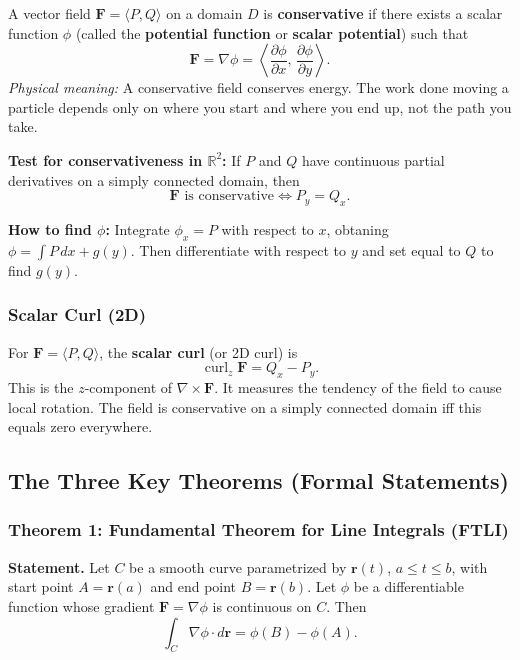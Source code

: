 \documentclass[11pt]{article}
\begin{document}
A vector field $\mathbf{F} = \langle P, Q \rangle$ on a domain $D$ is \textbf{conservative} if there exists a scalar function $\phi$ (called the \textbf{potential function} or \textbf{scalar potential}) such that
\[
  \mathbf{F} = \nabla\phi = \left\langle \frac{\partial\phi}{\partial x},\, \frac{\partial\phi}{\partial y} \right\rangle.
\]
\textit{Physical meaning:} A conservative field conserves energy. The work done moving a particle depends only on where you start and where you end up, not the path you take.

\textbf{Test for conservativeness in $\mathbb{R}^2$:} If $P$ and $Q$ have continuous partial derivatives on a simply connected domain, then
\[
  \mathbf{F} \text{ is conservative} \iff P_y = Q_x.
\]

\textbf{How to find $\phi$:} Integrate $\phi_x = P$ with respect to $x$, obtaning $\phi = \int P\,dx + g(y)$. Then differentiate with respect to $y$ and set equal to $Q$ to find $g(y)$.

\subsubsection*{Scalar Curl (2D)}

For $\mathbf{F} = \langle P, Q \rangle$, the \textbf{scalar curl} (or 2D curl) is
\[
  \operatorname{curl}_z\mathbf{F} = Q_x - P_y.
\]
This is the $z$-component of $\nabla\times\mathbf{F}$. It measures the tendency of the field to cause local rotation. The field is conservative on a simply connected domain iff this equals zero everywhere.

\subsection{The Three Key Theorems (Formal Statements)}

\subsubsection*{Theorem 1: Fundamental Theorem for Line Integrals (FTLI)}

\textbf{Statement.} Let $C$ be a smooth curve parametrized by $\mathbf{r}(t)$, $a \le t \le b$, with start point $A = \mathbf{r}(a)$ and end point $B = \mathbf{r}(b)$. Let $\phi$ be a differentiable function whose gradient $\mathbf{F} = \nabla\phi$ is continuous on $C$. Then
\[
  \boxed{\int_C \nabla\phi \cdot d\mathbf{r} = \phi(B) - \phi(A).}
\]
\end{document}
